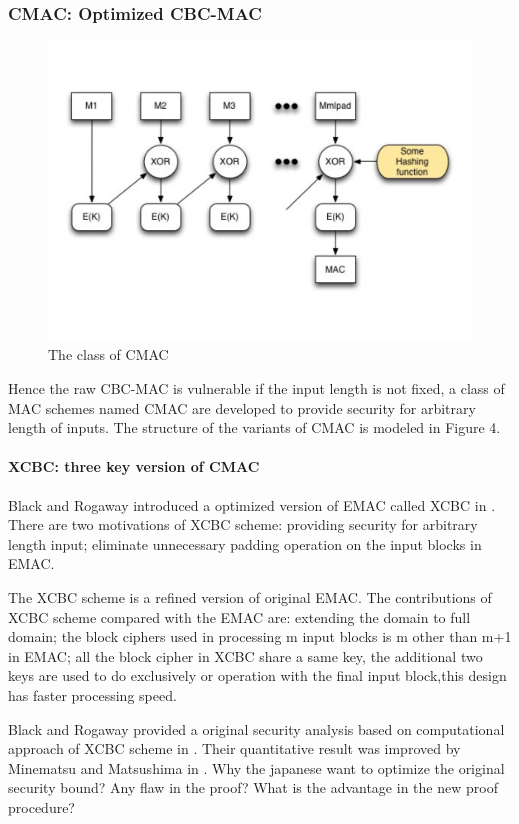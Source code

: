 \documentclass{article}
\begin{document}
\subsubsection{CMAC: Optimized CBC-MAC}
\begin{figure}[htbp]
\centering
\includegraphics[scale=0.3]{./diagram/cmac.pdf}
\caption{The class of CMAC}
\label{fig:4 }
\end{figure}
Hence the raw CBC-MAC is vulnerable if the input length is not fixed, a class of MAC schemes named CMAC are developed to provide security for arbitrary length of inputs. The structure of the  variants of CMAC is modeled in Figure 4.
\paragraph{XCBC: three key version of CMAC }
Black and Rogaway introduced a optimized version of EMAC called XCBC in \cite{xcbc}.
There are two motivations of XCBC scheme: providing security for arbitrary length input; eliminate unnecessary padding operation on the input blocks in EMAC.

The XCBC scheme is a refined version of original EMAC. The contributions of XCBC scheme compared with the EMAC are: extending the domain to full domain; the block ciphers used in processing m input blocks is m other than m+1 in EMAC; all the block cipher in XCBC share a same key, the additional two keys are used to do exclusively or operation with the final input block,this design has faster processing speed.   

Black and Rogaway provided a original security analysis based on computational approach of XCBC scheme in \cite{xcbc}. Their quantitative result was improved by Minematsu and Matsushima in \cite{new}. 
Why the japanese want to optimize the original security bound? Any flaw in the proof? What is the advantage in the new proof procedure?
\end{document}
